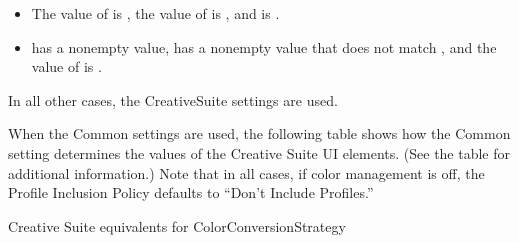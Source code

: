 \documentclass[letterpaper,12pt,english,openany,oneside]{sphinxmanual}
\begin{document}
\begin{itemize}
\item {} 
The value of  is  , the value of  is  , and  is  .

\item {} 
 has a non\sphinxhyphen{}empty value,  has a non\sphinxhyphen{}empty value that does not match  , and the value of  is  .

\end{itemize}

In all other cases, the CreativeSuite settings are used.

When the Common settings are used, the following table shows how the Common setting  determines the values of the Creative Suite UI elements. (See the table  for additional information.) Note that in all cases, if color management is off, the Profile Inclusion Policy defaults to “Don’t Include Profiles.”

Creative Suite equivalents for ColorConversionStrategy
\end{document}
